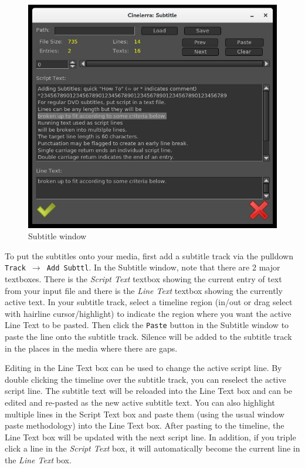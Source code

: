 \begin{figure}[htpb]
    \centering
    \includegraphics[width=0.8\linewidth]{images/subtitle01.png}
    \caption{Subtitle window}
    \label{fig:subtitle01}
\end{figure}

To put the subtitles onto your media, first add a subtitle track via the pulldown  \texttt{Track $\rightarrow$ Add Subttl}. In the Subtitle window, note that there are 2 major textboxes.  There is the \textit{Script Text} textbox showing the current entry of text from your input file and there is the \textit{Line Text} textbox showing the currently active text.  In your subtitle track, select a timeline region (in/out or drag select with hairline cursor/highlight) to indicate the region where you want the active Line Text to be pasted.  Then click the \texttt{Paste} button in the Subtitle window to paste the line onto the subtitle track.  Silence will be added to the subtitle track in the places in the media where there are gaps.

Editing in the Line Text box can be used to change the active script line. By double clicking the timeline over the subtitle track, you can reselect the active script line.  The subtitle text will be reloaded into the Line Text box and can be edited and re-pasted as the new active subtitle text.  You can also highlight multiple lines in the Script Text box and paste them (using the usual window paste methodology) into the Line Text box.  After pasting to the timeline, the Line Text box will be updated with the next script line.  In addition, if you triple click a line in the \textit{Script Text} box, it will automatically become the current line in the \textit{Line Text} box.

